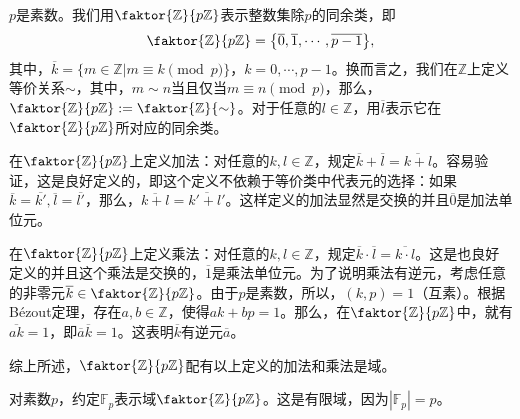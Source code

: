 \documentclass[lang=cn,10pt]{elegantbook}
\begin{document}
	\begin{example}
		$p$是素数。我们用$\faktor{\mathbb{Z}}{p\mathbb{Z}}$表示整数集除$p$的同余类，即
		\[\faktor{\mathbb{Z}}{p\mathbb{Z}}=\big\{\overline{0},\overline{1},\cdots,\overline{p-1}\big\},\]
		其中，$\overline{k}=\big\{m\in \mathbb{Z}\big| m\equiv k\pmod{p}\big\}$，$k=0,\cdots, p-1$。换而言之，我们在$\mathbb{Z}$上定义等价关系$\sim$，其中，$m\sim n$当且仅当$m\equiv n\pmod{p}$，那么，$\faktor{\mathbb{Z}}{p\mathbb{Z}}:= \faktor{\mathbb{Z}}{\sim}$。对于任意的$l\in \mathbb{Z}$，用$\overline{l}$表示它在$\faktor{\mathbb{Z}}{p\mathbb{Z}}$所对应的同余类。
		
		
		在$\faktor{\mathbb{Z}}{p\mathbb{Z}}$上定义加法：对任意的$k,l \in \mathbb{Z}$，规定$\overline{k}+\overline{l}=\overline{k+l}$。容易验证，这是良好定义的，即这个定义不依赖于等价类中代表元的选择：如果$\overline{k}=\overline{k'}, \overline{l}=\overline{l'}$，那么，$\overline{k+l}=\overline{k'+l'}$。这样定义的加法显然是交换的并且$\overline{0}$是加法单位元。
		
		
		
		
		在$\faktor{\mathbb{Z}}{p\mathbb{Z}}$上定义乘法：对任意的$k,l \in \mathbb{Z}$，规定$\overline{k}\cdot \overline{l}=\overline{k\cdot l}$。这是也良好定义的并且这个乘法是交换的，$\overline{1}$是乘法单位元。为了说明乘法有逆元，考虑任意的非零元$\overline{k}\in \faktor{\mathbb{Z}}{p\mathbb{Z}}$。由于$p$是素数，所以，$(k,p)=1$（互素）。根据B\'ezout定理，存在$a,b\in \mathbb{Z}$，使得$ak+bp=1$。那么，在$ \faktor{\mathbb{Z}}{p\mathbb{Z}}$中，就有$\overline{ak}=1$，即$\overline{a}\overline{k}=1$。这表明$\overline{k}$有逆元$\overline{a}$。
		
		综上所述，$\faktor{\mathbb{Z}}{p\mathbb{Z}}$配有以上定义的加法和乘法是域。
		
		对素数$p$，约定$\mathbb{F}_p$表示域$\faktor{\mathbb{Z}}{p\mathbb{Z}}$。这是有限域，因为$|\mathbb{F}_p|=p$。
	\end{example}
	
\end{document}

